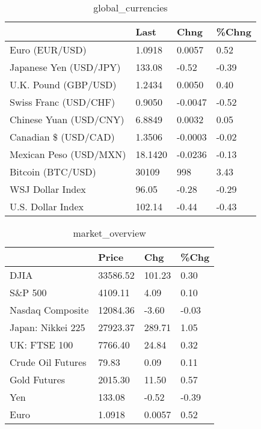 \documentclass{article}%
\begin{document}
%


\begin{table}[htbp]%
\caption{global\_currencies}%
\centering%
\begin{adjustbox}{width=1\textwidth}%
\begin{tabular}{llll}
\toprule
                       &    Last &    Chng & \%Chng \\
\midrule
        Euro (EUR/USD) &  1.0918 &  0.0057 &  0.52 \\
Japanese Yen (USD/JPY) &  133.08 &   -0.52 & -0.39 \\
  U.K. Pound (GBP/USD) &  1.2434 &  0.0050 &  0.40 \\
 Swiss Franc (USD/CHF) &  0.9050 & -0.0047 & -0.52 \\
Chinese Yuan (USD/CNY) &  6.8849 &  0.0032 &  0.05 \\
  Canadian \$ (USD/CAD) &  1.3506 & -0.0003 & -0.02 \\
Mexican Peso (USD/MXN) & 18.1420 & -0.0236 & -0.13 \\
     Bitcoin (BTC/USD) &   30109 &     998 &  3.43 \\
      WSJ Dollar Index &   96.05 &   -0.28 & -0.29 \\
     U.S. Dollar Index &  102.14 &   -0.44 & -0.43 \\
\bottomrule
\end{tabular}
%
\end{adjustbox}%
\end{table}

%


\begin{table}[htbp]%
\caption{market\_overview}%
\centering%
\begin{adjustbox}{width=1\textwidth}%
\begin{tabular}{llll}
\toprule
                  &    Price &    Chg &  \%Chg \\
\midrule
             DJIA & 33586.52 & 101.23 &  0.30 \\
          S\&P 500 &  4109.11 &   4.09 &  0.10 \\
 Nasdaq Composite & 12084.36 &  -3.60 & -0.03 \\
Japan: Nikkei 225 & 27923.37 & 289.71 &  1.05 \\
     UK: FTSE 100 &  7766.40 &  24.84 &  0.32 \\
Crude Oil Futures &    79.83 &   0.09 &  0.11 \\
     Gold Futures &  2015.30 &  11.50 &  0.57 \\
              Yen &   133.08 &  -0.52 & -0.39 \\
             Euro &   1.0918 & 0.0057 &  0.52 \\
\bottomrule
\end{tabular}
%
\end{adjustbox}%
\end{table}

%
\end{document}
